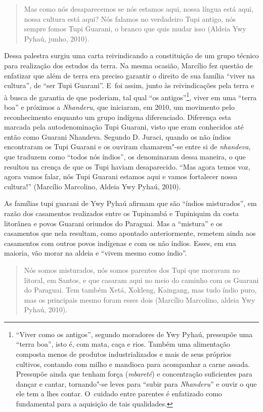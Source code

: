 \begin{quote}
\noindent
Mas como nós desaparecemos se nós estamos aqui, nossa língua está aqui,
nossa cultura está aqui? Nós falamos no verdadeiro Tupi antigo, nós
sempre fomos Tupi Guarani, o branco que quis mudar isso (Aldeia Ywy
Pyhaú, junho, 2010).
\end{quote}

Dessa palestra surgiu uma carta reivindicando a constituição de um grupo
técnico para realização dos estudos da terra. Na mesma ocasião,
Marcílio fez questão de enfatizar que além de terra era preciso
garantir o direito de sua família ``viver na cultura'', de ``ser Tupi
Guarani''. E~foi assim, junto às reivindicações pela terra e à busca de
garantia de que poderiam, tal qual ``os antigos''\footnote{``Viver como os
antigos'', segundo moradores de Ywy Pyhaú, pressupõe uma ``terra boa'', isto
é, com mata, caça e rios. Também uma alimentação composta menos de
produtos industrializados e mais de seus próprios cultivos, contando
com milho e mandioca para acompanhar a carne assada. Pressupõe ainda
que tenham força (\emph{mbareté}) e concentração suficientes para dançar e
cantar, tornando"-se leves para ``subir para \emph{Nhanderu}'' e ouvir o que ele
tem a lhes contar. O~cuidado entre parentes é enfatizado como
fundamental para a aquisição de tais qualidades.}, viver em uma ``terra
boa'' e próximos a \emph{Nhanderu}, que iniciaram, em 2010, um movimento pelo
reconhecimento enquanto um grupo indígena diferenciado. Diferença esta
marcada pela autodenominação Tupi Guarani, visto que eram conhecidos
até então como Guarani Nhandeva. Segundo D. Juraci, quando os não
índios encontraram os Tupi Guarani e os ouviram chamarem"-se entre si de
\emph{nhandeva}, que traduzem como ``todos nós índios'', os denominaram dessa
maneira, o que resultou na crença de que os Tupi haviam desaparecido.
``Mas agora temos voz, agora vamos falar, nós Tupi Guarani estamos aqui
e vamos fortalecer nossa cultura!'' (Marcílio Marcolino, Aldeia Ywy
Pyhaú, 2010).

As famílias tupi guarani de Ywy Pyhaú afirmam que são ``índios misturados'',
em razão dos casamentos realizados entre os Tupinambá e Tupiniquim da
costa litorânea e povos Guarani oriundos do Paraguai. Mas a ``mistura'' e
os casamentos que nela resultam, como apontado anteriormente, remetem
ainda aos casamentos com outros povos indígenas e com os não índios.
Esses, em sua maioria, vão morar na aldeia e ``vivem mesmo como índio''.

\begin{quote}
\noindent
Nós somos misturados, nós somos parentes dos Tupi que moravam no
litoral, em Santos, e que casaram aqui no meio do caminho com os
Guarani do Paraguai. Tem também Xetá, Xokleng, Kaingang, mas tudo índio
puro, mas os principais mesmo foram esses dois (Marcílio Marcolino,
aldeia Ywy Pyhaú, 2010).
\end{quote}

